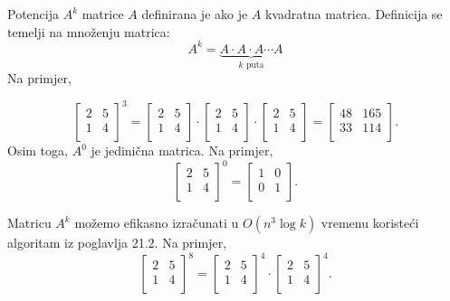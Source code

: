 
Potencija $A^k$ matrice $A$ definirana je
ako je $A$ kvadratna matrica.
Definicija se temelji na množenju matrica:
\[ A^k = \underbrace{A \cdot A \cdot A \cdots A}_{\textrm{$k$ puta}} \]
Na primjer,

\[
 \begin{bmatrix}
  2 & 5 \\
  1 & 4 \\
 \end{bmatrix}^3 =
 \begin{bmatrix}
  2 & 5 \\
  1 & 4 \\
 \end{bmatrix} \cdot
 \begin{bmatrix}
  2 & 5 \\
  1 & 4 \\
 \end{bmatrix} \cdot
 \begin{bmatrix}
  2 & 5 \\
  1 & 4 \\
 \end{bmatrix} =
 \begin{bmatrix}
  48 & 165 \\
  33 & 114 \\
 \end{bmatrix}.
\]
Osim toga, $A^0$ je jedinična matrica. Na primjer,
\[
 \begin{bmatrix}
  2 & 5 \\
  1 & 4 \\
 \end{bmatrix}^0 =
 \begin{bmatrix}
  1 & 0 \\
  0 & 1 \\
 \end{bmatrix}.
\]

Matricu $A^k$ možemo efikasno izračunati
u $O(n^3 \log k)$ vremenu koristeći
algoritam iz poglavlja 21.2. Na primjer,
\[
 \begin{bmatrix}
  2 & 5 \\
  1 & 4 \\
 \end{bmatrix}^8 =
 \begin{bmatrix}
  2 & 5 \\
  1 & 4 \\
 \end{bmatrix}^4 \cdot
 \begin{bmatrix}
  2 & 5 \\
  1 & 4 \\
 \end{bmatrix}^4.
\]


